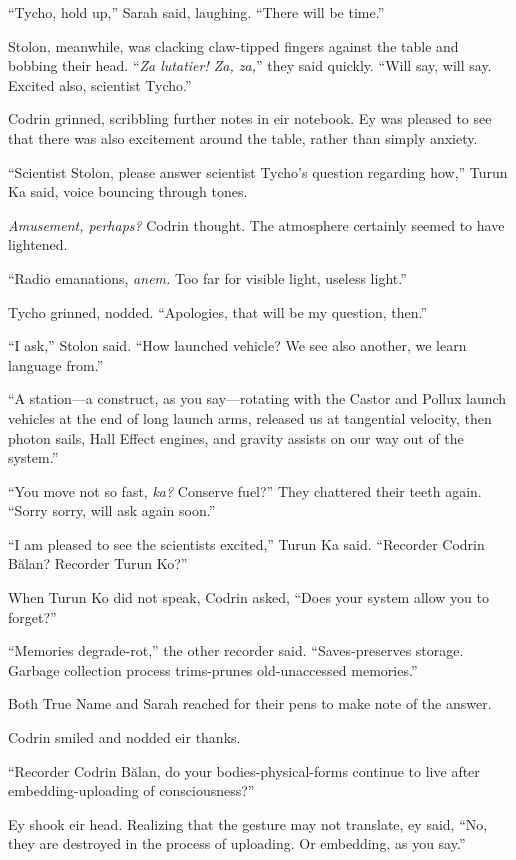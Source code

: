 ``Tycho, hold up,'' Sarah said, laughing. ``There will be time.''

Stolon, meanwhile, was clacking claw-tipped fingers against the table and bobbing their head. ``\emph{Za lutatier! Za, za,}'' they said quickly. ``Will say, will say. Excited also, scientist Tycho.''

Codrin grinned, scribbling further notes in eir notebook. Ey was pleased to see that there was also excitement around the table, rather than simply anxiety.

``Scientist Stolon, please answer scientist Tycho's question regarding how,'' Turun Ka said, voice bouncing through tones.

\emph{Amusement, perhaps?} Codrin thought. The atmosphere certainly seemed to have lightened.

``Radio emanations, \emph{anem.} Too far for visible light, useless light.''

Tycho grinned, nodded. ``Apologies, that will be my question, then.''

``I ask,'' Stolon said. ``How launched vehicle? We see also another, we learn language from.''

``A station—a construct, as you say—rotating with the Castor and Pollux launch vehicles at the end of long launch arms, released us at tangential velocity, then photon sails, Hall Effect engines, and gravity assists on our way out of the system.''

``You move not so fast, \emph{ka?} Conserve fuel?'' They chattered their teeth again. ``Sorry sorry, will ask again soon.''

``I am pleased to see the scientists excited,'' Turun Ka said. ``Recorder Codrin Bălan? Recorder Turun Ko?''

When Turun Ko did not speak, Codrin asked, ``Does your system allow you to forget?''

``Memories degrade-rot,'' the other recorder said. ``Saves-preserves storage. Garbage collection process trims-prunes old-unaccessed memories.''

Both True Name and Sarah reached for their pens to make note of the answer.

Codrin smiled and nodded eir thanks.

``Recorder Codrin Bălan, do your bodies-physical-forms continue to live after embedding-uploading of consciousness?''

Ey shook eir head. Realizing that the gesture may not translate, ey said, ``No, they are destroyed in the process of uploading. Or embedding, as you say.''


